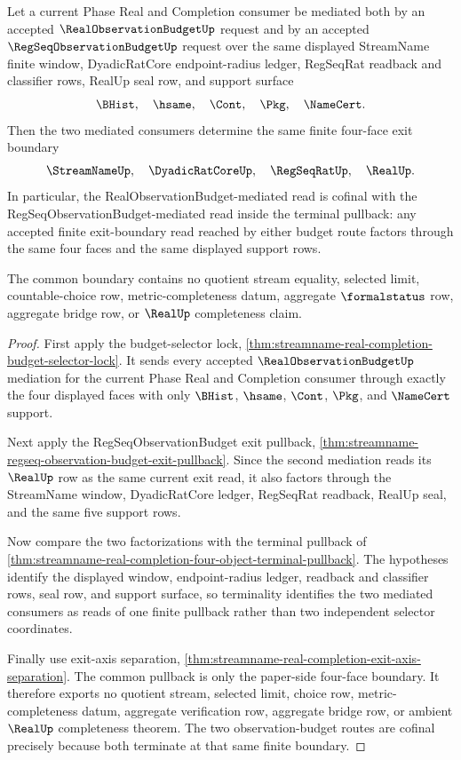 \begin{theorem}
\label{thm:streamname-dual-observation-budget-exit-cofinality}
Let a current Phase Real and Completion consumer be mediated both by an accepted $\RealObservationBudgetUp$ request and by an accepted $\RegSeqObservationBudgetUp$ request over the same displayed StreamName finite window, DyadicRatCore endpoint-radius ledger, RegSeqRat readback and classifier rows, RealUp seal row, and support surface
$$
\BHist,\quad \hsame,\quad \Cont,\quad \Pkg,\quad \NameCert.
$$
Then the two mediated consumers determine the same finite four-face exit boundary
$$
\StreamNameUp,\quad \DyadicRatCoreUp,\quad \RegSeqRatUp,\quad \RealUp.
$$
In particular, the RealObservationBudget-mediated read is cofinal with the RegSeqObservationBudget-mediated read inside the terminal pullback: any accepted finite exit-boundary read reached by either budget route factors through the same four faces and the same displayed support rows.

The common boundary contains no quotient stream equality, selected limit, countable-choice row, metric-completeness datum, aggregate $\formalstatus$ row, aggregate bridge row, or $\RealUp$ completeness claim.
\end{theorem}
\begin{proof}
First apply the budget-selector lock, \autoref{thm:streamname-real-completion-budget-selector-lock}. It sends every accepted $\RealObservationBudgetUp$ mediation for the current Phase Real and Completion consumer through exactly the four displayed faces with only $\BHist$, $\hsame$, $\Cont$, $\Pkg$, and $\NameCert$ support.

Next apply the RegSeqObservationBudget exit pullback, \autoref{thm:streamname-regseq-observation-budget-exit-pullback}. Since the second mediation reads its $\RealUp$ row as the same current exit read, it also factors through the StreamName window, DyadicRatCore ledger, RegSeqRat readback, RealUp seal, and the same five support rows.

Now compare the two factorizations with the terminal pullback of \autoref{thm:streamname-real-completion-four-object-terminal-pullback}. The hypotheses identify the displayed window, endpoint-radius ledger, readback and classifier rows, seal row, and support surface, so terminality identifies the two mediated consumers as reads of one finite pullback rather than two independent selector coordinates.

Finally use exit-axis separation, \autoref{thm:streamname-real-completion-exit-axis-separation}. The common pullback is only the paper-side four-face boundary. It therefore exports no quotient stream, selected limit, choice row, metric-completeness datum, aggregate verification row, aggregate bridge row, or ambient $\RealUp$ completeness theorem. The two observation-budget routes are cofinal precisely because both terminate at that same finite boundary.
\end{proof}
